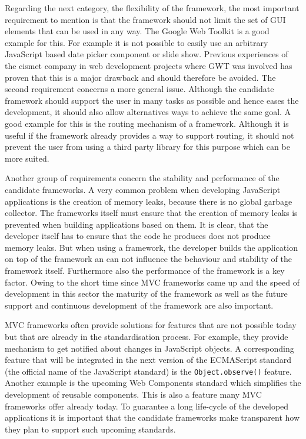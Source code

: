 Regarding the next category, the flexibility of the framework, the most important requirement to mention is that the framework should not limit the set of GUI elements that can be used in any way.
The Google Web Toolkit \autocite{conception:gwt} is a good example for this.
For example it is not possible to easily use an arbitrary JavaScript based date picker component or slide show.
Previous experiences of the cismet company in web development projects where GWT was involved has proven that this is a major drawback and should therefore be avoided.
The second requirement concerns a more general issue.
Although the candidate framework should support the user in many tasks as possible and hence eases the development, it should also allow alternatives ways to achieve the same goal.
A good example for this is the routing mechanism of a framework.
Although it is useful if the framework already provides a way to support routing, it should not prevent the user from using a third party library for this purpose which can be more suited.

Another group of requirements concern the stability and performance of the candidate frameworks.
A very common problem when developing JavaScript applications is the creation of memory leaks, because there is no global garbage collector.
The frameworks itself must ensure that the creation of memory leaks is prevented when building applications based on them. It is clear, that the developer itself has to ensure that the code he produces does not produce memory leaks. But when using a framework, the developer builds the application on top of the framework an can not influence the behaviour and stability of the framework itself.
Furthermore also the performance of the framework is a key factor.
Owing to the short time since MVC frameworks came up and the speed of development in this sector the maturity of the framework as well as the future support and continuous development of the framework are also important.

MVC frameworks often provide solutions for features that are not possible today but that are already in the standardisation process.
For example, they provide mechanism to get notified about changes in JavaScript objects.
A corresponding feature that will be integrated in the next version of the ECMAScript standard (the official name of the JavaScript standard) is the \texttt{Object.observe()} feature.
Another example is the upcoming Web Components standard which simplifies the development of reusable components.
This is also a feature many MVC frameworks offer already today.
To guarantee a long life-cycle of the developed applications it is important that the candidate frameworks make transparent how they plan to support such upcoming standards.
 

